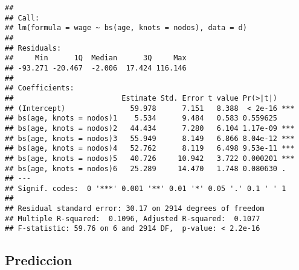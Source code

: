 \documentclass[
]{article}
\newenvironment{Shaded}{\begin{snugshade}}{\end{snugshade}}
\newcommand{\DataTypeTok}[1]{\textcolor[rgb]{0.13,0.29,0.53}{#1}}
\newcommand{\DecValTok}[1]{\textcolor[rgb]{0.00,0.00,0.81}{#1}}
\newcommand{\FloatTok}[1]{\textcolor[rgb]{0.00,0.00,0.81}{#1}}
\newcommand{\KeywordTok}[1]{\textcolor[rgb]{0.13,0.29,0.53}{\textbf{#1}}}
\newcommand{\NormalTok}[1]{#1}
\newcommand{\OperatorTok}[1]{\textcolor[rgb]{0.81,0.36,0.00}{\textbf{#1}}}
\newcommand{\StringTok}[1]{\textcolor[rgb]{0.31,0.60,0.02}{#1}}
\begin{document}
\begin{verbatim}
## 
## Call:
## lm(formula = wage ~ bs(age, knots = nodos), data = d)
## 
## Residuals:
##     Min      1Q  Median      3Q     Max 
## -93.271 -20.467  -2.006  17.424 116.146 
## 
## Coefficients:
##                         Estimate Std. Error t value Pr(>|t|)    
## (Intercept)               59.978      7.151   8.388  < 2e-16 ***
## bs(age, knots = nodos)1    5.534      9.484   0.583 0.559625    
## bs(age, knots = nodos)2   44.434      7.280   6.104 1.17e-09 ***
## bs(age, knots = nodos)3   55.949      8.149   6.866 8.04e-12 ***
## bs(age, knots = nodos)4   52.762      8.119   6.498 9.53e-11 ***
## bs(age, knots = nodos)5   40.726     10.942   3.722 0.000201 ***
## bs(age, knots = nodos)6   25.289     14.470   1.748 0.080630 .  
## ---
## Signif. codes:  0 '***' 0.001 '**' 0.01 '*' 0.05 '.' 0.1 ' ' 1
## 
## Residual standard error: 30.17 on 2914 degrees of freedom
## Multiple R-squared:  0.1096, Adjusted R-squared:  0.1077 
## F-statistic: 59.76 on 6 and 2914 DF,  p-value: < 2.2e-16
\end{verbatim}

\hypertarget{prediccion}{%
\subsection{Prediccion}\label{prediccion}}

\begin{Shaded}
\end{Shaded}
\end{document}
